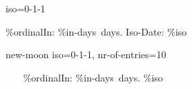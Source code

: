 \documentclass[paper=landscape]{scrartcl}
\begin{document}
\GetNextMoonphase  {} { iso=0-1-1 } 
  {  
     \%{ordinal}\space In: \%{in-days}\ days. Iso-Date: \%{iso} \par
  }

\par

\CompareMoons { \Solena, \Eria, \Surios } { new-moon} { iso=0-1-1, nr-of-entries=10 } 
  {
    \   \ \
    \%{ordinal}\space In: \%{in-days}\ days. \%{iso} 
    \par
 }




\end{document}
